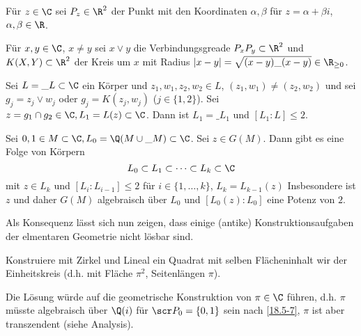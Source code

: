 Für $z \in \C$ sei $P_z \in \R^2$ der Punkt mit den Koordinaten $\alpha, \beta$ für $z = \alpha + \beta i$, $\alpha, \beta \in \R$.

\begin{conv} \label{18.5-5}
	Für $x,y \in \C$, $x \neq y$ sei $x \vee y$ die Verbindungsgreade $P_x P_y \subset \R^2$ und $K(X, Y) \subset \R^2$ der Kreis um $x$ mit Radius $|x-y| = \sqrt{(x-y)\_{(x-y)}} \in \R_{\ge 0}$.
\end{conv}

\begin{st} \label{18.5-6}
	Sei $L = \_L \subset \C$ ein Körper und $z_1, w_1, z_2, w_2 \in L$, $(z_1, w_1) \neq (z_2, w_2)$ und sei $g_j = z_j \vee w_j$ oder $g_j = K(z_j, w_j)$ ($j \in \{1, 2\}$).
	Sei $z = g_1 \cap g_2 \in \C, L_1 = L(z) \subset \C$.
	Dann ist $L_1 = \_{L_1}$ und $[L_1 : L] \le 2$.
\end{st}

\begin{kor} \label{18.5-7}
	Sei $0, 1 \in M \subset \C, L_0 = \Q(M \cup \_{M}) \subset \C$.
	Sei $z \in G(M)$.
	Dann gibt es eine Folge von Körpern
	\[
		L_0 \subset L_1 \subset \dotsb \subset L_k \subset \C
	\]
	mit $z \in L_k$ und $[L_i : L_{i-1}] \le 2$ für $i \in \{1, \dotsc, k\}$, $L_k = L_{k-1}(z)$
	Insbesondere ist $z$ und daher $G(M)$ algebraisch über $L_0$ und $[L_0(z) : L_0]$ eine Potenz von $2$.
\end{kor}

Als Konsequenz lässt sich nun zeigen, dass einige (antike) Konstruktionsaufgaben der elmentaren Geometrie nicht lösbar sind.

\begin{ex} \label{18.5-8}
	Konstruiere mit Zirkel und Lineal ein Quadrat mit selben Flächeninhalt wir der Einheitskreis (d.h. mit Fläche $\pi^2$, Seitenlängen $\pi$).

	Die Lösung würde auf die geometrische Konstruktion von $\pi \in \C$ führen, d.h. $\pi$ müsste algebraisch über $\Q(i)$ für $\scr P_0 = \{0, 1\}$ sein nach \ref{18.5-7}, $\pi$ ist aber transzendent (siehe Analysis).
\end{ex}
